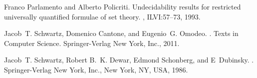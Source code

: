 \documentclass[a4paper,UKenglish]{lipics}
\begin{document}
\begin{small}
\begin{thebibliography}{10}
Franco Parlamento and Alberto Policriti.
\newblock Undecidability results for restricted universally quantified formulae
  of set theory.
, {ILVI}:57--73, 1993.

Jacob~T. Schwartz, Domenico Cantone, and Eugenio~G. Omodeo.
.
\newblock Texts in Computer Science. Springer-Verlag New York, Inc., 2011.

Jacob~T. Schwartz, Robert B.~K. Dewar, Edmond Schonberg, and E~Dubinsky.
.
\newblock Springer-Verlag New York, Inc., New York, NY, USA, 1986.

\end{thebibliography}
\end{small}
\end{document}
